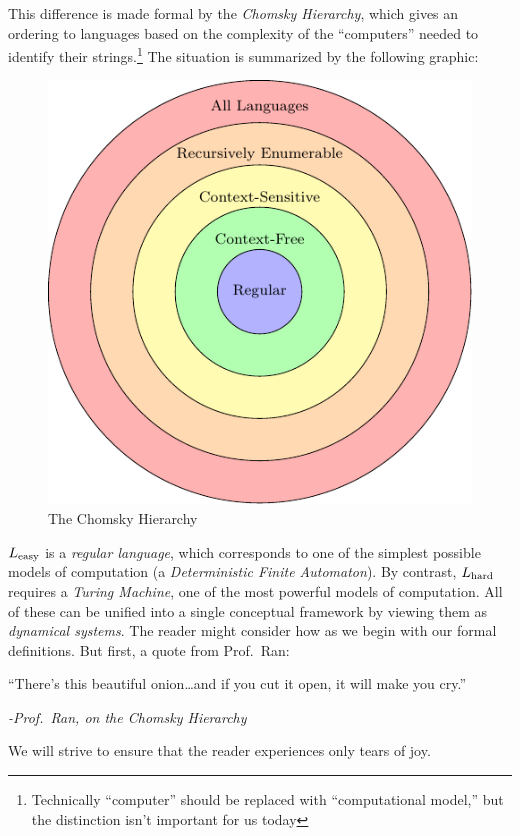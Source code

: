 \documentclass{fkpaper}
\begin{document}
\begin{multicols}{2}
  This difference is made formal by the \emph{Chomsky Hierarchy}, which
  gives an ordering to languages based on the complexity of the
  ``computers'' needed to identify their strings.\footnote{Technically
    ``computer'' should be replaced with ``computational model,'' but
    the distinction isn't important for us today} The situation is
  summarized by the following graphic:
  \begin{figure}[H]
    \centering
    \includegraphics[scale=.8]{figures/chomsky-hierarchy.pdf}
    \caption{The Chomsky Hierarchy}
    \label{fig:chomsky-hierarchy}
  \end{figure}
  $L_{\rm easy}$ is a \emph{regular language}, which corresponds to one
  of the simplest possible models of computation (a \emph{Deterministic
    Finite Automaton}). By contrast, $L_{\rm hard}$ requires a
  \emph{Turing Machine}, one of the most powerful models of computation.
  All of these can be unified into a single conceptual framework by
  viewing them as \emph{dynamical systems}. The reader might consider
  how as we begin with our formal definitions. But first, a quote from
  Prof.\ Ran:
  \begin{leftbar}
    ``There's this beautiful onion\ldots and if you cut it open, it will
    make you cry.''

    {\hfill\itshape -Prof.\ Ran, on the Chomsky Hierarchy}
  \end{leftbar}
  We will strive to ensure that the reader experiences only tears of
  joy.



\end{multicols}
\end{document}
